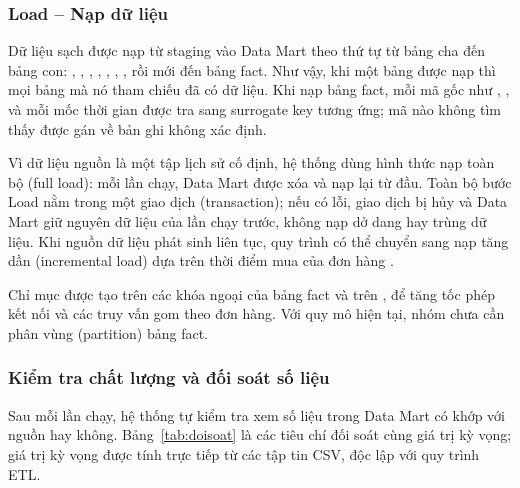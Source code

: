 \subsubsection{Load -- Nạp dữ liệu}

Dữ liệu sạch được nạp từ staging vào Data Mart theo thứ tự từ bảng cha đến bảng con: , , , , , , , rồi mới đến bảng fact. Như vậy, khi một bảng được nạp thì mọi bảng mà nó tham chiếu đã có dữ liệu. Khi nạp bảng fact, mỗi mã gốc như , ,  và mỗi mốc thời gian được tra sang surrogate key tương ứng; mã nào không tìm thấy được gán về bản ghi không xác định.

Vì dữ liệu nguồn là một tập lịch sử cố định, hệ thống dùng hình thức nạp toàn bộ (full load): mỗi lần chạy, Data Mart được xóa và nạp lại từ đầu. Toàn bộ bước Load nằm trong một giao dịch (transaction); nếu có lỗi, giao dịch bị hủy và Data Mart giữ nguyên dữ liệu của lần chạy trước, không nạp dở dang hay trùng dữ liệu. Khi nguồn dữ liệu phát sinh liên tục, quy trình có thể chuyển sang nạp tăng dần (incremental load) dựa trên thời điểm mua của đơn hàng \cite{kimball}.

Chỉ mục được tạo trên các khóa ngoại của bảng fact và trên , để tăng tốc phép kết nối và các truy vấn gom theo đơn hàng. Với quy mô hiện tại, nhóm chưa cần phân vùng (partition) bảng fact.

\subsubsection{Kiểm tra chất lượng và đối soát số liệu}

Sau mỗi lần chạy, hệ thống tự kiểm tra xem số liệu trong Data Mart có khớp với nguồn hay không. Bảng~\ref{tab:doisoat} là các tiêu chí đối soát cùng giá trị kỳ vọng; giá trị kỳ vọng được tính trực tiếp từ các tập tin CSV, độc lập với quy trình ETL.

